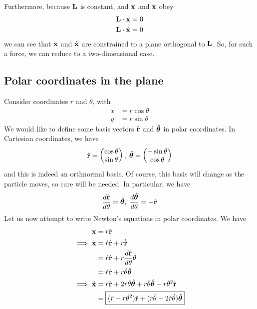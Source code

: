 \documentclass{../template/note}
\begin{document}
    Furthermore, because \(\V L\) is constant, and \(\V x\) and \(\dot{\V x}\) obey
    \begin{align*}
        \V L \cdot \V x &= 0 \\
        \V L \cdot \dot{\V x} &= 0
    \end{align*}
    we can see that \(\V x\) and \(\dot{\V x}\) are constrained to a plane orthogonal to \(\V L\). So, for such a force, we can reduce to a two-dimensional case.
    
    \subsection{Polar coordinates in the plane}

    Consider coordinates \(r\) and \(\theta\), with
    \begin{align*}
        x &= r \cos \theta \\
        y &= r \sin \theta
    \end{align*}
    We would like to define some basis vectors \(\hvec r\) and \(\hvec \theta\) in polar coordinates. In Cartesian coordinates, we have
    \begin{align*}
        \hvec r = \begin{pmatrix}
         \cos \theta \\
         \sin \theta \\
        \end{pmatrix}, \; \hvec \theta = \begin{pmatrix}
         -\sin \theta \\
         \cos \theta \\
        \end{pmatrix}
    \end{align*}
    and this is indeed an orthnormal basis. Of course, this basis will change as the particle moves, so care will be needed. In particular, we have
    \begin{align*}
        \frac{d \hvec r}{d \theta} = \hvec \theta, \; \frac{d\hvec \theta}{d \theta} = -\hvec r
    \end{align*}
    Let us now attempt to write Newton's equations in polar coordinates. We have
    \begin{align*}
        \V x &= r \hvec r \\
        \implies \dot{\V x} &= \dot r \hvec r + r \dot{\hvec r} \\
        &= \dot r \hvec r + r \frac{d \hvec r}{d \theta} \dot{\theta} \\
        &= \dot r \hvec r + r \dot{\theta} \hvec{\theta} \\
        \implies \ddot{\V x} &= \ddot r \hvec r + 2 \dot r \dot{\theta} \hvec{\theta} + r \ddot{\theta} \hvec{\theta} - r \dot{\theta}^2 \hvec r \\
        &= \boxed{(\ddot r - r\dot{\theta}^2)\hvec r + (r \ddot \theta + 2 \dot r \dot \theta)\hvec \theta}
    \end{align*}
    
\end{document}
